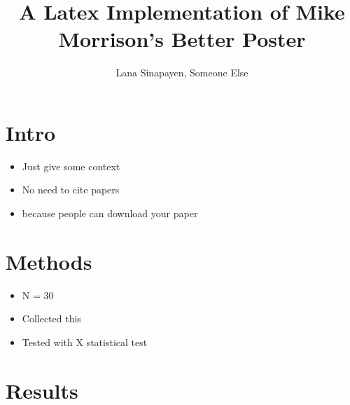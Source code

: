 \documentclass[12pt,a4paper]{article}
\title{A Latex Implementation of Mike Morrison's Better Poster}
\author{Lana Sinapayen, Someone Else}
\begin{document}

\noindent
\parbox[t][0.55\paperheight][t]{0.65\linewidth}{%

    {\let\newpage\relax\maketitle}
    
    \raggedcolumns
    \begin{multicols}{2}
    
    \section{Intro}
    \begin{itemize}
    \setlength\itemsep{0.1em}
        \item Just give some context
        \item No need to cite papers
        \item because people can download your paper
    \end{itemize}
    
    \section{Methods}
    \begin{itemize}
    \setlength\itemsep{0.1em}
        \item N = 30
        \item Collected this
        \item Tested with X statistical test
    \end{itemize}
    
    \columnbreak
    
    \section{Results}
    

\end{multicols}}
\end{document}
